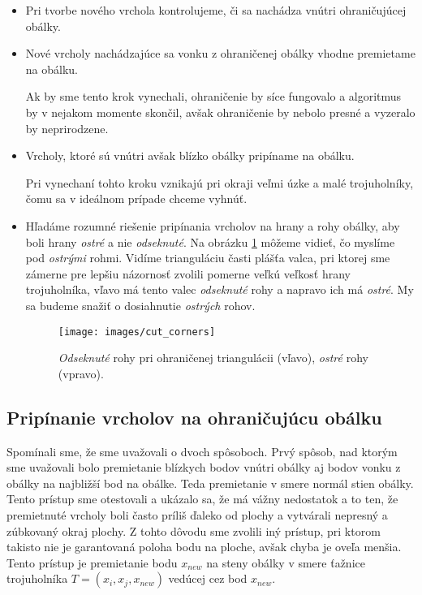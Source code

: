 \begin{itemize}
    \item{
        Pri tvorbe nového vrchola kontrolujeme, či sa nachádza vnútri ohraničujúcej obálky.
    }
    \item{
        Nové vrcholy nachádzajúce sa vonku z ohraničenej obálky vhodne premietame na obálku.

        Ak by sme tento krok vynechali, ohraničenie by síce fungovalo a algoritmus by v nejakom
        momente skončil, avšak ohraničenie by nebolo presné a vyzeralo by neprirodzene.
    }
    \item{
        Vrcholy, ktoré sú vnútri avšak blízko obálky pripíname na obálku.

        Pri vynechaní tohto kroku vznikajú pri okraji veľmi úzke a malé trojuholníky, čomu 
        sa v ideálnom prípade chceme vyhnúť.
    }
    \item{
        Hľadáme rozumné riešenie pripínania vrcholov na hrany a rohy obálky, aby boli hrany 
        \textit{ostré} 
        a nie \textit{odseknuté}. Na obrázku \ref{obr:cut_corners} môžeme vidieť, čo myslíme pod 
        \textit{ostrými} rohmi. Vidíme trianguláciu časti plášťa valca, pri ktorej sme zámerne pre
        lepšiu názornosť zvolili
        pomerne veľkú veľkosť hrany trojuholníka, vľavo má tento valec 
        \textit{odseknuté} rohy a napravo ich má \textit{ostré}. My sa budeme snažiť o dosiahnutie
        \textit{ostrých} rohov.

        \begin{figure}
            \centerline{\texttt{[image: images/cut\_corners]}}
            \caption[\textit{Ostré} a \textit{odseknuté} rohy pri ohraničenej triangulácii]
            {\textit{Odseknuté} rohy pri ohraničenej triangulácii (vľavo), \textit{ostré} rohy (vpravo).}
            \label{obr:cut_corners}
        \end{figure}
    }
\end{itemize}

\subsection{Pripínanie vrcholov na ohraničujúcu obálku}

Spomínali sme, že sme uvažovali o dvoch spôsoboch.
Prvý spôsob, nad ktorým sme uvažovali bolo premietanie blízkych bodov vnútri obálky aj 
bodov vonku z obálky na najbližší bod na obálke. Teda premietanie v smere normál stien obálky.
Tento prístup sme otestovali a ukázalo sa, že má vážny nedostatok a to ten, že premietnuté 
vrcholy boli často príliš ďaleko od plochy a vytvárali nepresný a zúbkovaný okraj plochy. 
Z tohto dôvodu
sme zvolili iný prístup, pri ktorom takisto nie je garantovaná poloha bodu na ploche, avšak 
chyba je oveľa menšia. Tento prístup je premietanie bodu $x_{new}$ na steny obálky v smere 
ťažnice trojuholníka $T = (x_i, x_j, x_{new})$ vedúcej cez bod $x_{new}$.

